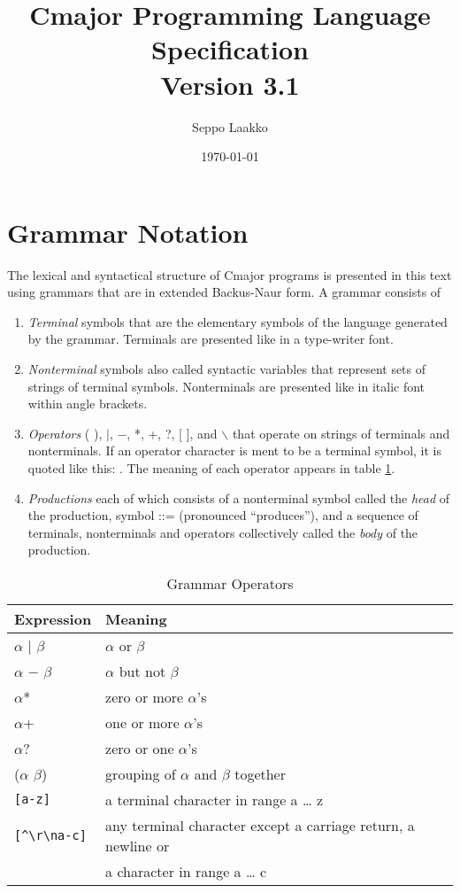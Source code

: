 \documentclass[a4paper,oneside,11pt]{article}
\begin{document}
\title{Cmajor Programming Language Specification\\Version 3.1}
\author{Seppo Laakko}
\date{\today}
\maketitle
\tableofcontents

\clearpage

\section{Grammar Notation}

The lexical and syntactical structure of Cmajor programs is presented in this text
using grammars that are in extended Backus-Naur form.
A grammar consists of

\begin{enumerate}
\item
\emph{Terminal} symbols that are the elementary symbols of the language generated by the grammar.
Terminals are presented like  in a type-writer font.
\item
\emph{Nonterminal} symbols also called syntactic variables that represent sets of strings of terminal symbols.
Nonterminals are presented like  in italic font within angle brackets.
\item
\emph{Operators} ( ), $|$, $-$, *, +, ?, [ ], and $\backslash$ that operate on strings of terminals and nonterminals.
If an operator character is ment to be a terminal symbol, it is quoted like this: \lit{*}.
The meaning of each operator appears in table \ref{tab:operators}.
\item
\emph{Productions} each of which consists of a nonterminal symbol called the \emph{head} of the production, symbol ::= (pronounced ``produces''), and
a sequence of terminals, nonterminals and operators collectively called the \emph{body} of the production.
\end{enumerate}

\begin{table}[htb]
\caption{Grammar Operators}\label{tab:operators}
\begin{tabular}{ll}
\bf{Expression}& \bf{Meaning}\\
\hline
$\alpha$ $|$ $\beta$ & $\alpha$ or $\beta$\\
$\alpha$ $-$ $\beta$ & $\alpha$ but not $\beta$\\
$\alpha$* & zero or more $\alpha$'s\\
$\alpha$+ & one or more $\alpha$'s\\
$\alpha$? & zero or one $\alpha$'s\\
($\alpha$ $\beta$) & grouping of $\alpha$ and $\beta$ together\\
\verb|[a-z]| & a terminal character in range a \ldots{} z\\
\verb|[^\r\na-c]| & any terminal character except a carriage return, a newline or\\& a character in range a \ldots{} c\\
\end{tabular}
\end{table}
\end{document}
